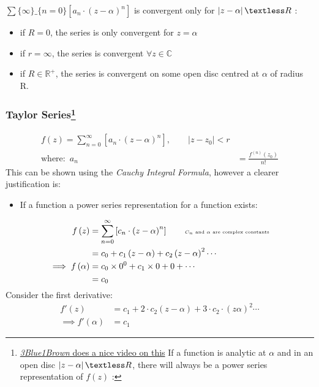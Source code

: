 \documentclass[class=article, crop=false]{standalone}
\begin{document}
\(\sum\{\infty\}\_\{n= 0\}
\left[ a_n\cdot \left( z- \alpha \right) ^n \right] \) is convergent
only for \( \left\lvert{} z- \alpha \right\rvert{} \textless R\) :

\begin{itemize}
\item
  if \(R= 0\), the series is only convergent for \(z= \alpha\)
\item
  if \(r = \infty\), the series is convergent \(\forall z\in \mathbb{C}
  \)
\item
  if \(R \in \mathbb{R} ^+\), the series is convergent on some open disc
  centred at \(\alpha\) of radius R.
\end{itemize}

\hypertarget{taylor-seriestsrs3}{%
\subsubsection[Taylor Series]{\texorpdfstring{Taylor
Series\footnote{\href{https://www.youtube.com/watch?v=3d6DsjIBzJ4}{\emph{3Blue1Brown}
  does a nice video on this} If a function is analytic at \(\alpha\) and
  in an open disc \( \left\lvert{} z- \alpha \right\rvert{}
  \textless R\), there will always be a power series representation of
  \(f\left( z \right) \) :}}{Taylor Series}}\label{taylor-seriestsrs3}}

\begin{align*}
  f\left( z \right) =  \sum^{\infty}_{n= 0}   \left[ a_n\cdot \left( z- \alpha \right) ^n \right] , \qquad     \left| z- z_0 \right| < r&\\
  \text{where:}\enspace a_n &= \frac{f^{\left( n \right) }\left( z_0 \right) }{n!}
\end{align*}
 This can be shown using the \emph{Cauchy Integral Formula}, however a
clearer justification is:

\begin{itemize}
\item
  If a function a power series representation for a function exists:
\end{itemize}

\begin{align*}
  f\left( z \right) &= \sum^{\infty}_{n= 0}   \left[ c_n\cdot \left( z- \alpha \right) ^n \right] \qquad {\tiny \text{$C_n$ and $\alpha$ are complex constants}}\\
  &= c_0 +  c_1\left( z- \alpha \right) + c_2\left( z- \alpha \right) ^2 \cdots\\
  \implies   f \left( \alpha \right) &= c_0\times 0^0 +  c_1\times 0 + 0 + \cdots \\
  &= c_0\\
\end{align*}
 Consider the first derivative:
\begin{align*}
f'\left( z \right) &= c_1 + 2\cdot c_2\left( z- \alpha \right) + 3\cdot c_2\cdot \left( z\alpha \right) ^2\cdots\\
 \implies  f'\left( \alpha \right) &= c_1
\end{align*}
\end{document}
